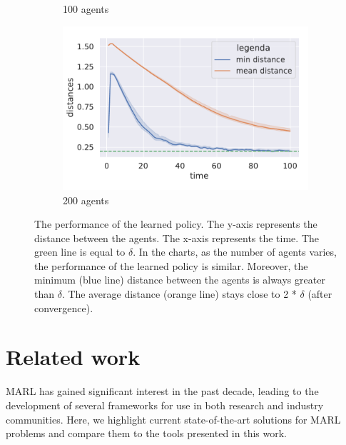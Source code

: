 \begin{figure}[h!]
\begin{subfigure}[b]{0.32\textwidth}
        \caption{100 agents}
    \end{subfigure}
    \hfill
    \begin{subfigure}[b]{0.32\textwidth}
        \centering
        \includegraphics[width=\textwidth]{papers/coordination2023/imgs/data-200.pdf}
        \caption{200 agents}
    \end{subfigure}
\caption[The performance of the learned policy in \scarlib{}]{The performance of the learned policy. 
The y-axis represents the distance between the agents.
The x-axis represents the time.
The green line is equal to $\delta$.
In the charts, as the number of agents varies, the performance of the learned policy is similar.
Moreover, the minimum (blue line) distance between the agents is always greater than $\delta$.
The average distance (orange line) stays close to 2 * $\delta$ (after convergence).
}
\label{coordination2023:fig:test}
\end{figure}

\section{Related work}\label{coordination2023:sec:related}
MARL has gained significant interest in the past decade, 
 leading to the development of several frameworks 
 for use in both research and industry communities. 
Here, we highlight current state-of-the-art solutions 
 for MARL problems and compare 
 them to the tools presented in this work.
